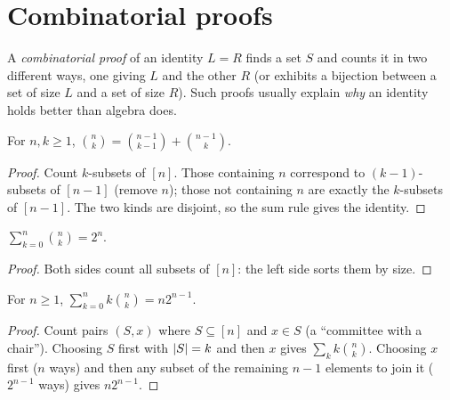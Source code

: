 \section{Combinatorial proofs}

A \emph{combinatorial proof} of an identity $L = R$ finds a set $S$ and counts it in two
different ways, one giving $L$ and the other $R$ (or exhibits a bijection between a set of
size $L$ and a set of size $R$). Such proofs usually explain \emph{why} an identity holds better
than algebra does.

\begin{theorem}
For $n, k \ge 1$, $\displaystyle \binom{n}{k} = \binom{n-1}{k-1} + \binom{n-1}{k}$.
\end{theorem}
\begin{proof}
Count $k$-subsets of $[n]$. Those containing $n$ correspond to $(k-1)$-subsets of $[n-1]$
(remove $n$); those not containing $n$ are exactly the $k$-subsets of $[n-1]$. The two kinds
are disjoint, so the sum rule gives the identity.
\end{proof}

\begin{center}
\end{center}

\begin{theorem}
$\displaystyle \sum_{k=0}^n \binom{n}{k} = 2^n$.
\end{theorem}
\begin{proof}
Both sides count all subsets of $[n]$: the left side sorts them by size.
\end{proof}

\begin{theorem}
For $n \ge 1$, $\displaystyle \sum_{k=0}^n k\binom{n}{k} = n2^{n-1}$.
\end{theorem}
\begin{proof}
Count pairs $(S, x)$ where $S \subseteq [n]$ and $x \in S$ (a ``committee with a chair'').
Choosing $S$ first with $\left\lvert S \right\rvert = k$ and then $x$ gives $\sum_k k\binom{n}{k}$. Choosing $x$
first ($n$ ways) and then any subset of the remaining $n-1$ elements to join it ($2^{n-1}$ ways)
gives $n2^{n-1}$.
\end{proof}

